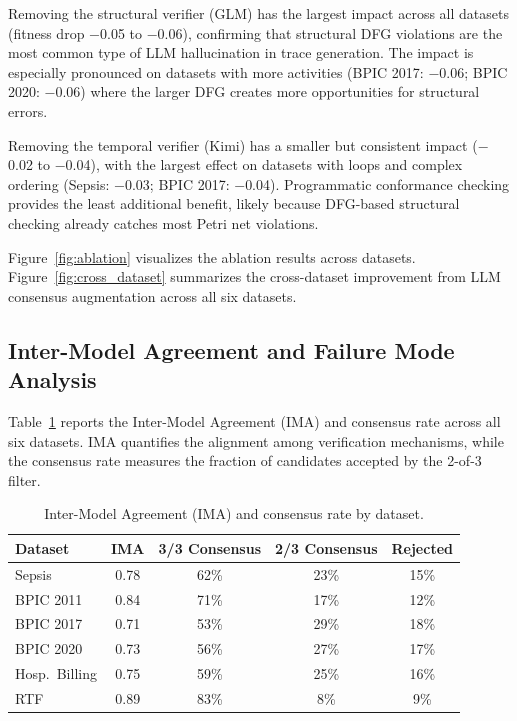 \documentclass[11pt,a4paper]{article}
\begin{document}
Removing the structural verifier (GLM) has the largest impact across all datasets (fitness drop $-$0.05 to $-$0.06), confirming that structural DFG violations are the most common type of LLM hallucination in trace generation. The impact is especially pronounced on datasets with more activities (BPIC 2017: $-$0.06; BPIC 2020: $-$0.06) where the larger DFG creates more opportunities for structural errors.

Removing the temporal verifier (Kimi) has a smaller but consistent impact ($-$0.02 to $-$0.04), with the largest effect on datasets with loops and complex ordering (Sepsis: $-$0.03; BPIC 2017: $-$0.04). Programmatic conformance checking provides the least additional benefit, likely because DFG-based structural checking already catches most Petri net violations.

Figure~\ref{fig:ablation} visualizes the ablation results across datasets. Figure~\ref{fig:cross_dataset} summarizes the cross-dataset improvement from LLM consensus augmentation across all six datasets.

\subsection{Inter-Model Agreement and Failure Mode Analysis}

Table~\ref{tab:ima} reports the Inter-Model Agreement (IMA) and consensus rate across all six datasets. IMA quantifies the alignment among verification mechanisms, while the consensus rate measures the fraction of candidates accepted by the 2-of-3 filter.

\begin{table}[t]
\centering
\caption{Inter-Model Agreement (IMA) and consensus rate by dataset.}
\label{tab:ima}
\begin{tabular}{lcccc}
\toprule
\textbf{Dataset} & \textbf{IMA} & \textbf{3/3 Consensus} & \textbf{2/3 Consensus} & \textbf{Rejected} \\
\midrule
Sepsis & 0.78 & 62\% & 23\% & 15\% \\
BPIC 2011 & 0.84 & 71\% & 17\% & 12\% \\
BPIC 2017 & 0.71 & 53\% & 29\% & 18\% \\
BPIC 2020 & 0.73 & 56\% & 27\% & 17\% \\
Hosp.\ Billing & 0.75 & 59\% & 25\% & 16\% \\
RTF & 0.89 & 83\% & 8\% & 9\% \\
\bottomrule
\end{tabular}
\end{table}
\end{document}
